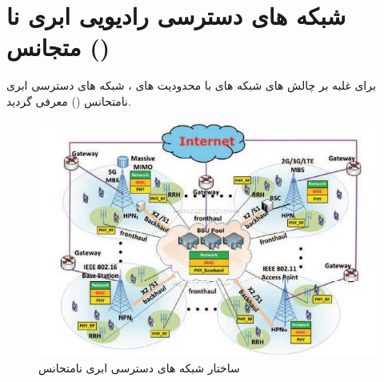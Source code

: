 \section{شبکه های دسترسی رادیویی ابری نا متجانس ()}
برای غلبه بر چالش های شبکه های  با محدودیت های  ، شبکه های دسترسی ابری نامتحانس () معرفی گردید\cite{ fogComputing, heterogeneous, fogEdge}.
\begin{figure}
  \centering
    \includegraphics[scale = 0.8]{./pic1/hc}
  \caption{ ساختار شبکه های دسترسی ابری نامتحانس \cite{heterogeneous}  }
  \label{fig:hc}
\end{figure}

